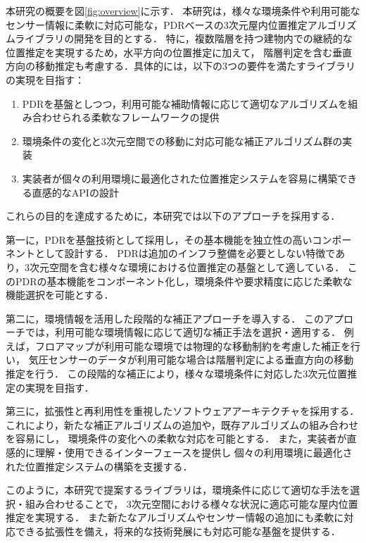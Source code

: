 本研究の概要を図\ref{fig:overview}に示す．
本研究は，様々な環境条件や利用可能なセンサー情報に柔軟に対応可能な，PDRベースの3次元屋内位置推定アルゴリズムライブラリの開発を目的とする．
特に，複数階層を持つ建物内での継続的な位置推定を実現するため，水平方向の位置推定に加えて，
階層判定を含む垂直方向の移動推定も考慮する．具体的には，以下の3つの要件を満たすライブラリの実現を目指す：

\begin{enumerate}
    \item PDRを基盤としつつ，利用可能な補助情報に応じて適切なアルゴリズムを組み合わせられる柔軟なフレームワークの提供
    \item 環境条件の変化と3次元空間での移動に対応可能な補正アルゴリズム群の実装
    \item 実装者が個々の利用環境に最適化された位置推定システムを容易に構築できる直感的なAPIの設計
\end{enumerate}

これらの目的を達成するために，本研究では以下のアプローチを採用する．

第一に，PDRを基盤技術として採用し，その基本機能を独立性の高いコンポーネントとして設計する．
PDRは追加のインフラ整備を必要としない特徴であり，3次元空間を含む様々な環境における位置推定の基盤として適している．
このPDRの基本機能をコンポーネント化し，環境条件や要求精度に応じた柔軟な機能選択を可能とする．

第二に，環境情報を活用した段階的な補正アプローチを導入する．
このアプローチでは，利用可能な環境情報に応じて適切な補正手法を選択・適用する．
例えば，フロアマップが利用可能な環境では物理的な移動制約を考慮した補正を行い，
気圧センサーのデータが利用可能な場合は階層判定による垂直方向の移動推定を行う．
この段階的な補正により，様々な環境条件に対応した3次元位置推定の実現を目指す．

第三に，拡張性と再利用性を重視したソフトウェアアーキテクチャを採用する．
これにより，新たな補正アルゴリズムの追加や，既存アルゴリズムの組み合わせを容易にし，
環境条件の変化への柔軟な対応を可能とする．
また，実装者が直感的に理解・使用できるインターフェースを提供し
個々の利用環境に最適化された位置推定システムの構築を支援する．

このように，本研究で提案するライブラリは，環境条件に応じて適切な手法を選択・組み合わせることで，
3次元空間における様々な状況に適応可能な屋内位置推定を実現する．
また新たなアルゴリズムやセンサー情報の追加にも柔軟に対応できる拡張性を備え，将来的な技術発展にも対応可能な基盤を提供する．

